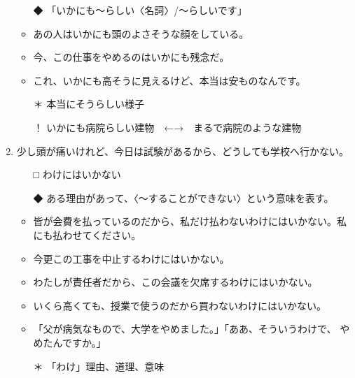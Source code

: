 \documentclass[
uplatex,
b5paper,
10pt,
dvipdfmx
]{jsbook}
\begin{document}
\begin{enumerate}
\begin{itemize}
\item[◆] 「いかにも〜らしい〈名詞〉/〜らしいです」
\end{itemize}
\begin{itemize}
\item あの人はいかにも頭のよさそうな顔をしている。
\item 今、この仕事をやめるのはいかにも残念だ。
\item これ、いかにも高そうに見えるけど、本当は安ものなんです。
\item[＊]  本当にそうらしい様子
\item[！]  いかにも病院らしい建物　←→　まるで病院のような建物
\end{itemize}

\item 少し頭が痛いけれど、今日は試験があるから、どうしても学校へ行かない\underline{\hspace{3zw}}。
\begin{itemize}
 \item[□] わけにはいかない
 \item[◆] ある理由があって、〈〜することができない〉という意味を表す。
\end{itemize}
\begin{itemize}
 \item 皆が会費を払っているのだから、私だけ払わないわけにはいかない。私
       にも払わせてください。
 \item 今更この工事を中止するわけにはいかない。
 \item わたしが責任者だから、この会議を欠席するわけにはいかない。
 \item いくら高くても、授業で使うのだから買わないわけにはいかない。  
 \item 「父が病気なもので、大学をやめました。」「ああ、そういうわけで、
       やめたんですか。」
 \item[＊] 「わけ」理由、道理、意味
\end{itemize}


\end{enumerate}
\end{document}
